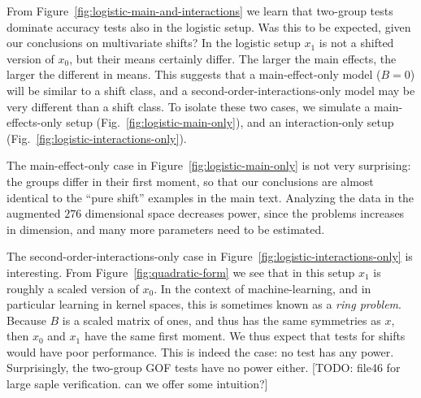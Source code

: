 \documentclass[]{bio}
\begin{document}
From Figure~\ref{fig:logistic-main-and-interactions} we learn that two-group tests dominate accuracy tests also in the logistic setup.
Was this to be expected, given our conclusions on multivariate shifts?
In the logistic setup $x_1$ is not a shifted version of $x_0$, but their means certainly differ. 
The larger the main effects, the larger the different in means.
This suggests that a main-effect-only model ($B=0$) will be similar to a shift class, and a second-order-interactions-only model may be very different than a shift class.
To isolate these two cases, we simulate a main-effects-only setup (Fig.~\ref{fig:logistic-main-only}), and an interaction-only setup (Fig.~\ref{fig:logistic-interactions-only}).

The main-effect-only case in Figure~\ref{fig:logistic-main-only} is not very surprising: 
the groups differ in their first moment, so that our conclusions are almost identical to the ``pure shift'' examples in the main text. 
Analyzing the data in the augmented $276$ dimensional space decreases power, since the problems increases in dimension, and many more parameters need to be estimated. 

The second-order-interactions-only case in Figure~\ref{fig:logistic-interactions-only} is interesting. 
From Figure~\ref{fig:quadratic-form} we see that in this setup $x_1$ is roughly a scaled version of $x_0$.
In the context of machine-learning, and in particular learning in kernel spaces, this is sometimes known as a \emph{ring problem}.
Because $B$ is a scaled matrix of ones, and thus has the same symmetries as $x$, then $x_0$ and $x_1$ have the same first moment. 
We thus expect that tests for shifts would have poor performance. 
This is indeed the case: no test has any power. 
Surprisingly, the two-group GOF tests have no power either.
[TODO: file46 for large saple verification. can we offer some intuition?]
\end{document}
